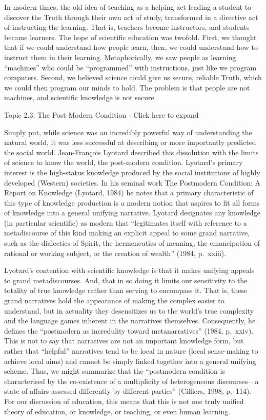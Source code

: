 \documentclass[
]{book}
\begin{document}
In modern times, the old idea of teaching as a helping act leading a student to discover the Truth through their own act of study, transformed in a directive act of instructing the learning. That is, teachers become instructors, and students became learners. The hope of scientific education was twofold. First, we thought that if we could understand how people learn, then, we could understand how to instruct them in their learning. Metaphorically, we saw people as learning ``machines'' who could be ``programmed'' with instructions, just like we program computers. Second, we believed science could give us secure, reliable Truth, which we could then program our minds to hold. The problem is that people are not machines, and scientific knowledge is not secure.

Topic 2.3: The Post-Modern Condition - Click here to expand

Simply put, while science was an incredibly powerful way of understanding the natural world, it was less successful at describing or more importantly predicted the social world. Jean-François Lyotard described this dissolution with the limits of science to know the world, the post-modern condition. Lyotard's primary interest is the high-status knowledge produced by the social institutions of highly developed (Western) societies. In his seminal work The Postmodern Condition: A Report on Knowledge (Lyotard, 1984) he notes that a primary characteristic of this type of knowledge production is a modern notion that aspires to fit all forms of knowledge into a general unifying narrative. Lyotard designates any knowledge (in particular scientific) as modern that ``legitimates itself with reference to a metadiscourse of this kind making an explicit appeal to some grand narrative, such as the dialectics of Spirit, the hermeneutics of meaning, the emancipation of rational or working subject, or the creation of wealth'' (1984, p.~xxiii).

Lyotard's contention with scientific knowledge is that it makes unifying appeals to grand metadiscourses. And, that in so doing it limits our sensitivity to the totality of true knowledge rather than serving to encompass it. That is, these grand narratives hold the appearance of making the complex easier to understand, but in actuality they desensitizes us to the world's true complexity and the language games inherent in the narratives themselves. Consequently, he defines the ``postmodern as incredulity toward metanarratives'' (1984, p.~xxiv). This is not to say that narratives are not an important knowledge form, but rather that ``helpful'' narratives tend to be local in nature (local sense-making to achieve local aims) and cannot be simply linked together into a general unifying scheme. Thus, we might summarize that the ``postmodern condition is characterised by the co-existence of a multiplicity of heterogeneous discourses---a state of affairs assessed differently by different parties'' (Cilliers, 1998, p.~114). For our discussion of education, this means that this is not one truly unified theory of education, or knowledge, or teaching, or even human learning.
\end{document}
